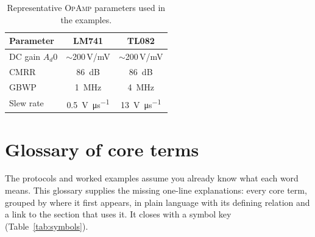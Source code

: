 \documentclass[11pt,a4paper,oneside]{book}
\newcommand{\Ad}{A_d}
\newcommand{\op}{\textsc{OpAmp}}
\begin{document}
\begin{table}[h]\centering\small
\caption{Representative \op{} parameters used in the examples.}
\begin{tabular}{@{}lcc@{}}
\toprule
Parameter & LM741 & TL082\\
\midrule
DC gain $\Ad0$ & $\sim$\num{200}\,V/mV & $\sim$\num{200}\,V/mV\\
CMRR & \qty{86}{\dB} & \qty{86}{\dB}\\
GBWP & \qty{1}{\mega\hertz} & \qty{4}{\mega\hertz}\\
Slew rate & \qty{0.5}{\volt\per\micro\second} & \qty{13}{\volt\per\micro\second}\\
\bottomrule
\end{tabular}
\end{table}

\chapter{Glossary of core terms}\label{app:glossary}
The protocols and worked examples assume you already know what each word means.
This glossary supplies the missing one-line explanations: every core term, grouped
by where it first appears, in plain language with its defining relation and a link
to the section that uses it. It closes with a symbol key
(Table~\ref{tab:symbols}).
\end{document}
